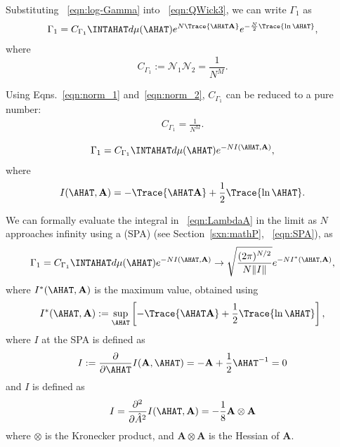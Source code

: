 Substituting
\EQN~\ref{eqn:log-Gamma}
into \EQN~\ref{eqn:QWick3},
we can write $\Gamma_1$ as
\begin{eqnarray}
  \label{eqn:gamma1}
\Gamma_1  = C_{\Gamma_1} \INTAHAT d\mu(\AHAT) e^{ N \Trace{ \AHAT\mathbf{A} } } e^{ -\frac{N}{2} \Trace{ \ln\AHAT } }  ,
\end{eqnarray}
where
\begin{equation}
    C_{\Gamma_1}:=\mathcal{N}_1 \mathcal{N}_2 = \frac{1}{N^M} .
\end{equation}

Using Eqns.~\ref{eqn:norm_1} and~\ref{eqn:norm_2}, $C_{\Gamma_1}$ can be reduced to a pure number:
\begin{align}
  \label{eqn:CGamma1}
  C_{\Gamma_1} = \frac{1}{N^M} .
\end{align}

\begin{align}
\label{eqn:LambdaA}
\Gamma_1 = C_{\Gamma_1} \INTAHAT d\mu(\AHAT) e^{-N I(\AHAT,\mathbf{A})}  ,
\end{align}
where
\begin{align}
\label{eqn:IAA}
I(\AHAT,\mathbf{A}) = -\Trace{ \AHAT\mathbf{A} } + \frac{1}{2}\Trace{ \ln\AHAT }  .
\end{align}

We can formally evaluate the integral in \EQN~\ref{eqn:LambdaA} in the limit as $N$ approaches infinity using a \SaddlePointApproximation (SPA)
(see Section~\ref{sxn:mathP}, \EQN~\ref{eqn:SPA}), as
\begin{align}
\label{eqn:LAMBDA}
\Gamma_1 = C_{\Gamma_1} \INTAHAT d\mu(\AHAT) e^{-N I(\AHAT,\mathbf{A})}  \rightarrow \sqrt{\dfrac{(2\pi)^{N/2}}{N\Vert I\Vert}}e^{-N I^{*}(\AHAT, \mathbf{A})}  ,
\end{align}
where $I^{*}(\AHAT,\mathbf{A})$ is the maximum value, obtained using
\begin{align}
  \label{eqn:IAA-sup}
  I^{*}(\AHAT,\mathbf{A}) :=
  \underset{\AHAT}{\sup}\left[-\Trace{\AHAT\mathbf{A}}+\frac{1}{2}\Trace{\ln\AHAT}\right]  ,
\end{align}
where $I$ at the SPA is defined as
\begin{align}
  \label{eqn:SP0}
  I := \frac{\partial}{\partial\AHAT}I(\mathbf{A},\AHAT) = -\mathbf{A} + \frac{1}{2}\AHAT^{-1} = 0  
\end{align}
and $I$ is defined as
\begin{align}
  \label{eqn:Ixx}
  I = \frac{\partial^2 }{\partial \hat{A}^2} I(\AHAT,\mathbf{A}) = -\frac{1}{8} \mathbf{A} \otimes \mathbf{A}
\end{align}
where $\otimes$ is the Kronecker product, and $\mathbf{A} \otimes \mathbf{A}$ is the Hessian of $\mathbf{A}$.
    
